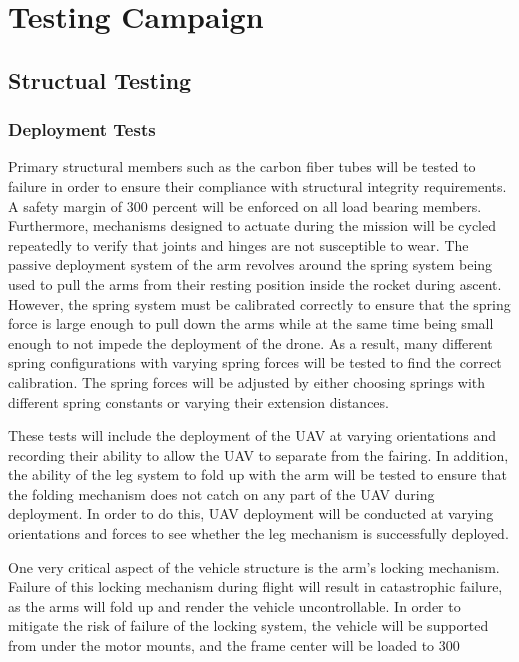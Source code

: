 \chapter{Testing Campaign}

\section{Structual Testing}\label{PL:Testing:Structural}
	\subsection{Deployment Tests}
	Primary structural members such as the carbon fiber tubes will be tested to failure in order to ensure their compliance with structural integrity requirements. A safety margin of 300 percent will be enforced on all load bearing members. Furthermore, mechanisms designed to actuate during the mission will be cycled repeatedly to verify that joints and hinges are not susceptible to wear. The passive deployment system of the arm revolves around the spring system being used to pull the arms from their resting position inside the rocket during ascent. However, the spring system must be calibrated correctly to ensure that the spring force is large enough to pull down  the arms while at the same time being small enough to not impede the deployment of the drone. As a result, many different spring configurations with varying spring forces will be tested to find the correct calibration. The spring forces will be adjusted by either choosing springs with different spring constants or varying their extension distances. 

	These tests will include the deployment of the UAV at varying orientations and recording their ability to allow the UAV to separate from the fairing. In addition, the ability of the leg system to fold up with the arm will be tested to ensure that the folding mechanism does not catch on any part of the UAV during deployment. In order to do this, UAV deployment will be conducted at varying orientations and forces to see whether the leg mechanism is successfully deployed.
	
	One very critical aspect of the vehicle structure is the arm’s locking mechanism. Failure of this locking mechanism during flight will result in catastrophic failure, as the arms will fold up and render the vehicle uncontrollable. In order to mitigate the risk of failure of the locking system, the vehicle will be supported from under the motor mounts, and the frame center will be loaded to 300%
	
